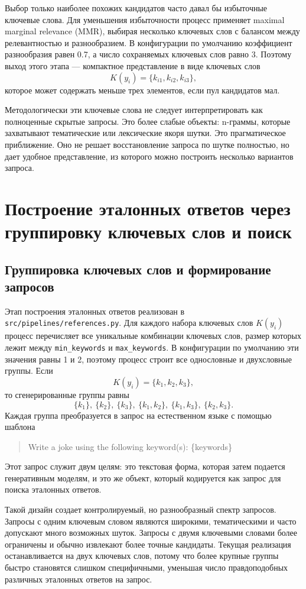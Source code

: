 Выбор только наиболее похожих кандидатов часто давал бы избыточные ключевые слова. Для уменьшения избыточности процесс применяет maximal marginal relevance (MMR), выбирая несколько ключевых слов с балансом между релевантностью и разнообразием. В конфигурации по умолчанию коэффициент разнообразия равен 0.7, а число сохраняемых ключевых слов равно \(3\). Поэтому выход этого этапа --- компактное представление в виде ключевых слов
\[
 K(y_i)=\{k_{i1},k_{i2},k_{i3}\},
\]
которое может содержать меньше трех элементов, если пул кандидатов мал.

Методологически эти ключевые слова не следует интерпретировать как полноценные скрытые запросы. Это более слабые объекты: n-граммы, которые захватывают тематические или лексические якоря шутки. Это прагматическое приближение. Оно не решает восстановление запроса по шутке полностью, но дает удобное представление, из которого можно построить несколько вариантов запроса.

\section{Построение эталонных ответов через группировку ключевых слов и поиск}

\subsection{Группировка ключевых слов и формирование запросов}

Этап построения эталонных ответов реализован в \texttt{src/pipelines/references.py}. Для каждого набора ключевых слов \(K(y_i)\) процесс перечисляет все уникальные комбинации ключевых слов, размер которых лежит между \texttt{min\_keywords} и \texttt{max\_keywords}. В конфигурации по умолчанию эти значения равны 1 и 2, поэтому процесс строит все однословные и двухсловные группы. Если
\[
 K(y_i)=\{k_1,k_2,k_3\},
\]
то сгенерированные группы равны
\[
 \{k_1\},\ \{k_2\},\ \{k_3\},\ \{k_1,k_2\},\ \{k_1,k_3\},\ \{k_2,k_3\}.
\]
Каждая группа преобразуется в запрос на естественном языке с помощью шаблона
\begin{quote}
 \ttfamily
 Write a joke using the following keyword(s): \{keywords\}
\end{quote}
Этот запрос служит двум целям: это текстовая форма, которая затем подается генеративным моделям, и это же объект, который кодируется как запрос для поиска эталонных ответов.

Такой дизайн создает контролируемый, но разнообразный спектр запросов. Запросы с одним ключевым словом являются широкими, тематическими и часто допускают много возможных шуток. Запросы с двумя ключевыми словами более ограничены и обычно извлекают более точные кандидаты. Текущая реализация останавливается на двух ключевых слов, потому что более крупные группы быстро становятся слишком специфичными, уменьшая число правдоподобных различных эталонных ответов на запрос.

